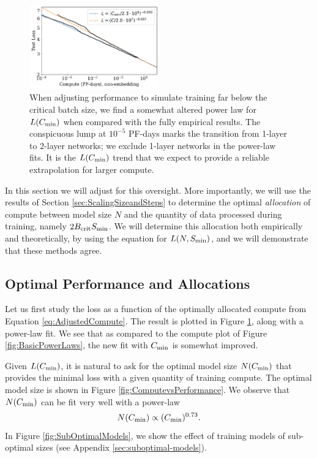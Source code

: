 \documentclass[english]{article}
\newcommand{\be}{\begin{equation}}
\newcommand{\ee}{\end{equation}}
\begin{document}
\begin{figure}
\centering{}
\includegraphics[width=0.5\textwidth]{ComputeEfficientFrontierWithAdjustment}  
\caption[Comparison between empirical and adjusted compute trends]{
When adjusting performance to simulate training far below the critical batch size, we find a somewhat altered power law for $L(C_{\rm min})$ when compared with the fully empirical results.  The conspicuous lump at $10^{-5}$ PF-days marks the transition from 1-layer to 2-layer networks; we exclude 1-layer networks in the power-law fits.  It is the $L(C_{\rm min})$ trend that we expect to provide a reliable extrapolation for larger compute.
\label{fig:ComputeEfficientAdjusted}}
\end{figure}

In this section we will adjust for this oversight. More importantly, we will use the results of Section \ref{sec:ScalingSizeandSteps} to determine the optimal \emph{allocation} of compute between model size $N$ and the quantity of data processed during training, namely $2 B_{\rm crit}  S_{\rm min}$.  We will determine this allocation both empirically and theoretically, by using the equation for $L(N, S_{\rm min})$, and we will demonstrate that these methods agree.

\subsection{Optimal Performance and Allocations}

Let us first study the loss as a function of the optimally allocated compute from Equation \eqref{eq:AdjustedCompute}.  The result is plotted in Figure \ref{fig:ComputeEfficientAdjusted}, along with a power-law fit.  We see that as compared to the compute plot of Figure \ref{fig:BasicPowerLaws}, the new fit with $C_{\rm min}$ is somewhat improved.  

Given $L(C_{\rm min})$, it is natural to ask for the optimal model size $N(C_{\rm min})$ that provides the minimal loss with a given quantity of training compute.  The optimal model size is shown in Figure \ref{fig:ComputevsPerformance}.  We observe that $N(C_{\rm min})$ can be fit very well with a power-law
\be
N(C_{\rm min}) \propto (C_{\rm min})^{0.73}.
\ee
In Figure \ref{fig:SubOptimalModels}, we show the effect of training models of sub-optimal sizes (see Appendix \ref{sec:suboptimal-models}).
\end{document}
